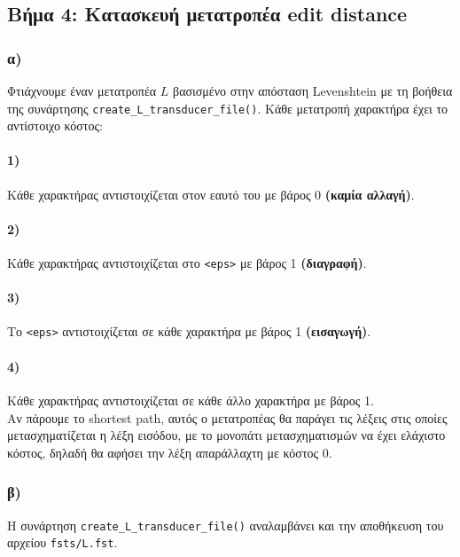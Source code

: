 \documentclass[a4paper, 12pt]{article}
\begin{document}
    \subsection*{Βήμα 4: Κατασκευή μετατροπέα edit distance}
        \subsubsection*{α)}
        	Φτιάχνουμε έναν μετατροπέα $L$ βασισμένο στην απόσταση Levenshtein με τη βοήθεια της συνάρτησης \verb|create_L_transducer_file()|. Κάθε μετατροπή χαρακτήρα έχει το αντίστοιχο κόστος:
            
            \paragraph*{1)}
            	Κάθε χαρακτήρας αντιστοιχίζεται στον εαυτό του με βάρος 0 \textbf{(καμία αλλαγή)}.
            	
            \paragraph*{2)}
            	Κάθε χαρακτήρας αντιστοιχίζεται στο \verb|<eps>| με βάρος 1 \textbf{(διαγραφή)}.
            
            \paragraph*{3)}
            	Το \verb|<eps>| αντιστοιχίζεται σε κάθε χαρακτήρα με βάρος 1 \textbf{(εισαγωγή)}.
            
            \paragraph*{4)}
            	Κάθε χαρακτήρας αντιστοιχίζεται σε κάθε άλλο χαρακτήρα με βάρος 1. \\
        
        Αν πάρουμε το shortest path, αυτός ο μετατροπέας θα παράγει τις λέξεις στις οποίες μετασχηματίζεται η λέξη εισόδου, με το μονοπάτι μετασχηματισμών να έχει ελάχιστο κόστος, δηλαδή θα αφήσει την λέξη απαράλλαχτη με κόστος 0. 
        
        \subsubsection*{β)}
        	Η συνάρτηση \verb|create_L_transducer_file()| αναλαμβάνει και την αποθήκευση του αρχείου \verb|fsts/L.fst|.
        	
\end{document}
